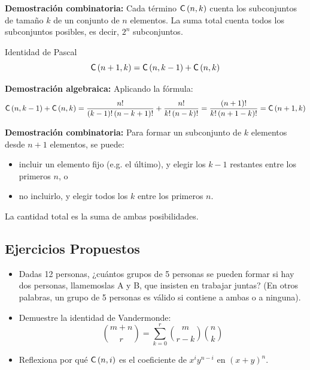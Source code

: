 \noindent \textbf{Demostración combinatoria:} Cada término $\mathsf{C}\left(n,k\right)$ cuenta los subconjuntos de tamaño $k$ de un conjunto de $n$ elementos. La suma total cuenta todos los subconjuntos posibles, es decir, $2^n$ subconjuntos.


\begin{thmblock}{Identidad de Pascal}
\[
\mathsf{C}\left(n+1,k\right) = \mathsf{C}\left(n,k-1\right) + \mathsf{C}\left(n,k\right)
\]
\end{thmblock}
\noindent \textbf{Demostración algebraica:} Aplicando la fórmula:
\[
\mathsf{C}\left(n,k-1\right) + \mathsf{C}\left(n,k\right) = \frac{n!}{(k-1)! \, (n-k+1)!} + \frac{n!}{k! \, (n-k)!} = \frac{(n+1)!}{k! \, (n+1-k)!} = \mathsf{C}\left(n+1,k\right)
\]

\noindent\textbf{Demostración combinatoria:} Para formar un subconjunto de $k$ elementos desde $n+1$ elementos, se puede:
\begin{itemize}
  \item incluir un elemento fijo (e.g. el último), y elegir los $k-1$ restantes entre los primeros $n$, o
  \item no incluirlo, y elegir todos los $k$ entre los primeros $n$.
\end{itemize}
La cantidad total es la suma de ambas posibilidades.





\subsection*{Ejercicios Propuestos}

\begin{itemize}
\item Dadas 12 personas, ¿cuántos grupos de 5 personas se pueden formar si hay dos personas, llamemoslas A y B, que insisten en trabajar juntas?
(En otros palabras, un grupo de 5 personas es válido si contiene a ambas o a ninguna).

\item
Demuestre la identidad de Vandermonde:
\[
\binom{m+n}{r} = \sum_{k=0}^r \binom{m}{r-k} \binom{n}{k}
\]

\item
Reflexiona por qué $\mathsf{C}\left(n,i\right)$ es el coeficiente de $x^i y^{n-i}$ en $(x+y)^n$.

\end{itemize}
